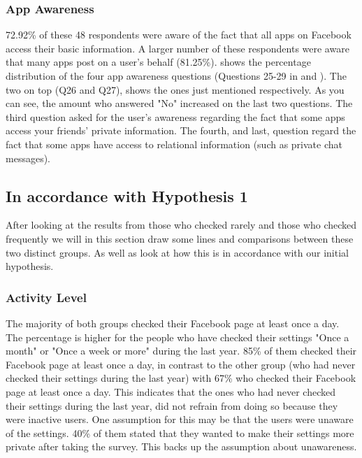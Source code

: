

\subsubsection{App Awareness}
72.92\% of these 48 respondents were aware of the fact that all apps on Facebook access their basic information. A larger number of these respondents were aware that many apps post on a user's behalf (81.25\%).  shows the percentage distribution of the four app awareness questions (Questions 25-29 in  and ). The two on top (Q26 and Q27), shows the ones just mentioned respectively. As you can see, the amount who answered "No" increased on the last two questions. The third question asked for the user's awareness regarding the fact that some apps access your friends' private information. The fourth, and last, question regard the fact that some apps have access to relational information (such as private chat messages).  

\subsection{In accordance with Hypothesis 1}
After looking at the results from those who checked rarely and those who checked frequently we will in this section draw some lines and comparisons between these two distinct groups. As well as look at how this is in accordance with our initial hypothesis. 

\subsubsection{Activity Level}
The majority of both groups checked their Facebook page at least once a day. The percentage is higher for the people who have checked their settings "Once a month" or "Once a week or more" during the last year. 85\% of them checked their Facebook page at least once a day, in contrast to the other group (who had never checked their settings during the last year) with 67\% who checked their Facebook page at least once a day. This indicates that the ones who had never checked their settings during the last year, did not refrain from doing so because they were inactive users. One assumption for this may be that the users were unaware of the settings. 40\% of them stated that they wanted to make their settings more private after taking the survey. This backs up the assumption about unawareness.  

